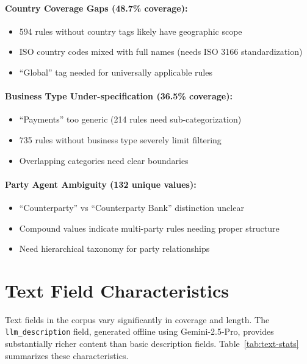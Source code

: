\paragraph{Country Coverage Gaps (48.7\% coverage):}
\begin{itemize}[leftmargin=*,itemsep=2pt,topsep=2pt]
 \item 594 rules without country tags likely have geographic scope
 \item ISO country codes mixed with full names (needs ISO 3166 standardization)
 \item ``Global'' tag needed for universally applicable rules
\end{itemize}

\paragraph{Business Type Under-specification (36.5\% coverage):}
\begin{itemize}[leftmargin=*,itemsep=2pt,topsep=2pt]
 \item ``Payments'' too generic (214 rules need sub-categorization)
 \item 735 rules without business type severely limit filtering
 \item Overlapping categories need clear boundaries
\end{itemize}

\paragraph{Party Agent Ambiguity (132 unique values):}
\begin{itemize}[leftmargin=*,itemsep=2pt,topsep=2pt]
 \item ``Counterparty'' vs ``Counterparty Bank'' distinction unclear
 \item Compound values indicate multi-party rules needing proper structure
 \item Need hierarchical taxonomy for party relationships
\end{itemize}

\section{Text Field Characteristics}

Text fields in the corpus vary significantly in coverage and length. The \texttt{llm\_description} field, generated offline using Gemini-2.5-Pro, provides substantially richer content than basic description fields. Table~\ref{tab:text-stats} summarizes these characteristics.


